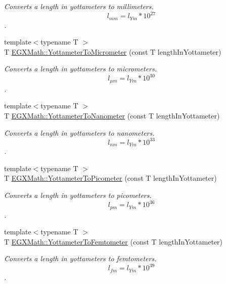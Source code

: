 \begin{DoxyCompactItemize}
\begin{DoxyCompactList}\small\item\em Converts a length in yottameters to millimeters. \[ l_{mm}=l_{Ym} * 10^{27} \]. \end{DoxyCompactList}\item 
{\footnotesize template$<$typename T $>$ }\\T \mbox{\hyperlink{group___e_g_x_math-_conversions-_length_conversions-_s_i-_yottameter-_s_i_ga25310d8ba2830f305680927ac3c13c38}{E\+G\+X\+Math\+::\+Yottameter\+To\+Micrometer}} (const T length\+In\+Yottameter)
\begin{DoxyCompactList}\small\item\em Converts a length in yottameters to micrometers. \[ l_{\mu m}=l_{Ym} * 10^{30} \]. \end{DoxyCompactList}\item 
{\footnotesize template$<$typename T $>$ }\\T \mbox{\hyperlink{group___e_g_x_math-_conversions-_length_conversions-_s_i-_yottameter-_s_i_ga9e117a640ecd0bea911edac05c685c31}{E\+G\+X\+Math\+::\+Yottameter\+To\+Nanometer}} (const T length\+In\+Yottameter)
\begin{DoxyCompactList}\small\item\em Converts a length in yottameters to nanometers. \[ l_{nm}=l_{Ym} * 10^{33} \]. \end{DoxyCompactList}\item 
{\footnotesize template$<$typename T $>$ }\\T \mbox{\hyperlink{group___e_g_x_math-_conversions-_length_conversions-_s_i-_yottameter-_s_i_ga7af9d1314de06921546f079641c033b2}{E\+G\+X\+Math\+::\+Yottameter\+To\+Picometer}} (const T length\+In\+Yottameter)
\begin{DoxyCompactList}\small\item\em Converts a length in yottameters to picometers. \[ l_{pm}=l_{Ym} * 10^{36} \]. \end{DoxyCompactList}\item 
{\footnotesize template$<$typename T $>$ }\\T \mbox{\hyperlink{group___e_g_x_math-_conversions-_length_conversions-_s_i-_yottameter-_s_i_ga02dbecce4d520a89139e6de0e2fec6d9}{E\+G\+X\+Math\+::\+Yottameter\+To\+Femtometer}} (const T length\+In\+Yottameter)
\begin{DoxyCompactList}\small\item\em Converts a length in yottameters to femtometers. \[ l_{fm}=l_{Ym} * 10^{39} \]. \end{DoxyCompactList}\item 

\end{DoxyCompactItemize}
